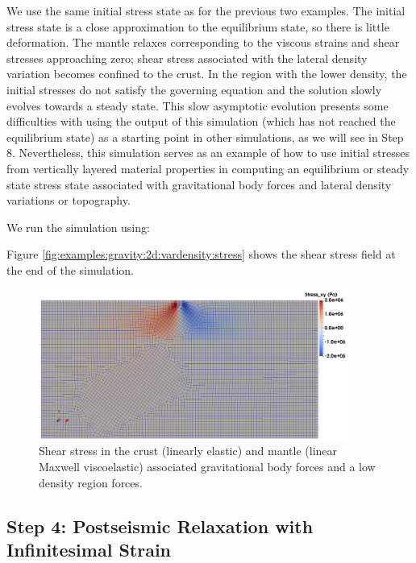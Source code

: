 We use the same initial stress state as for the previous two examples.
The initial stress state is a close approximation to the equilibrium
state, so there is little deformation. The mantle relaxes
corresponding to the viscous strains and shear stresses approaching
zero; shear stress associated with the lateral density variation
becomes confined to the crust. In the region with the lower density,
the initial stresses do not satisfy the governing equation and the
solution slowly evolves towards a steady state. This slow asymptotic
evolution presents some difficulties with using the output of this
simulation (which has not reached the equilibrium state) as a starting
point in other simulations, as we will see in Step 8. Nevertheless,
this simulation serves as an example of how to use initial stresses
from vertically layered material properties in computing an
equilibrium or steady state stress state associated with gravitational
body forces and lateral density variations or topography.

We run the simulation using:
Figure \vref{fig:examples:gravity:2d:vardensity:stress} shows the
shear stress field at the end of the simulation.

\begin{figure}
  \includegraphics[width=4in]{examples/figs/grav2d_vardensity-shearstress}
  \caption{Shear stress in the crust (linearly elastic) and mantle
    (linear Maxwell viscoelastic) associated gravitational body forces
    and a low density region forces.}
  \label{fig:examples:gravity:2d:vardensity:stress}
\end{figure}


\subsection{Step 4: Postseismic Relaxation with Infinitesimal Strain}


